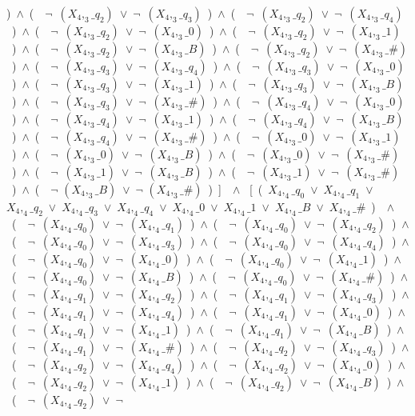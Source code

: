 ﻿\documentclass[a4paper,10pt]{article}
\begin{document}
)\ $\wedge$\ (\ \ $\neg$\ $(X_4,_3\_q_2)$\ $\vee$\ $\neg$\ $(X_4,_3\_q_3)$\ )\ $\wedge$\ (\ \ $\neg$\ $(X_4,_3\_q_2)$\ $\vee$\ $\neg$\ $(X_4,_3\_q_4)$\ )\ $\wedge$\ (\ \ $\neg$\ $(X_4,_3\_q_2)$\ $\vee$\ $\neg$\ $(X_4,_3\_0)$\ )\ $\wedge$\ (\ \ $\neg$\ $(X_4,_3\_q_2)$\ $\vee$\ $\neg$\ $(X_4,_3\_1)$\ )\ $\wedge$\ (\ \ $\neg$\ $(X_4,_3\_q_2)$\ $\vee$\ $\neg$\ $(X_4,_3\_B)$\ )\ $\wedge$\ (\ \ $\neg$\ $(X_4,_3\_q_2)$\ $\vee$\ $\neg$\ $(X_4,_3\_\#)$\ )\ $\wedge$\ (\ \ $\neg$\ $(X_4,_3\_q_3)$\ $\vee$\ $\neg$\ $(X_4,_3\_q_4)$\ )\ $\wedge$\ (\ \ $\neg$\ $(X_4,_3\_q_3)$\ $\vee$\ $\neg$\ $(X_4,_3\_0)$\ )\ $\wedge$\ (\ \ $\neg$\ $(X_4,_3\_q_3)$\ $\vee$\ $\neg$\ $(X_4,_3\_1)$\ )\ $\wedge$\ (\ \ $\neg$\ $(X_4,_3\_q_3)$\ $\vee$\ $\neg$\ $(X_4,_3\_B)$\ )\ $\wedge$\ (\ \ $\neg$\ $(X_4,_3\_q_3)$\ $\vee$\ $\neg$\ $(X_4,_3\_\#)$\ )\ $\wedge$\ (\ \ $\neg$\ $(X_4,_3\_q_4)$\ $\vee$\ $\neg$\ $(X_4,_3\_0)$\ )\ $\wedge$\ (\ \ $\neg$\ $(X_4,_3\_q_4)$\ $\vee$\ $\neg$\ $(X_4,_3\_1)$\ )\ $\wedge$\ (\ \ $\neg$\ $(X_4,_3\_q_4)$\ $\vee$\ $\neg$\ $(X_4,_3\_B)$\ )\ $\wedge$\ (\ \ $\neg$\ $(X_4,_3\_q_4)$\ $\vee$\ $\neg$\ $(X_4,_3\_\#)$\ )\ $\wedge$\ (\ \ $\neg$\ $(X_4,_3\_0)$\ $\vee$\ $\neg$\ $(X_4,_3\_1)$\ )\ $\wedge$\ (\ \ $\neg$\ $(X_4,_3\_0)$\ $\vee$\ $\neg$\ $(X_4,_3\_B)$\ )\ $\wedge$\ (\ \ $\neg$\ $(X_4,_3\_0)$\ $\vee$\ $\neg$\ $(X_4,_3\_\#)$\ )\ $\wedge$\ (\ \ $\neg$\ $(X_4,_3\_1)$\ $\vee$\ $\neg$\ $(X_4,_3\_B)$\ )\ $\wedge$\ (\ \ $\neg$\ $(X_4,_3\_1)$\ $\vee$\ $\neg$\ $(X_4,_3\_\#)$\ )\ $\wedge$\ (\ \ $\neg$ $(X_4,_3\_B)$\ $\vee$\ $\neg$ $(X_4,_3\_\#)$\ )\ ]\ \ $\wedge$ \ [\ (\ $X_4,_4\_q_0$\ $\vee$\ $X_4,_4\_q_1$\ $\vee$\ $X_4,_4\_q_2$\ $\vee$\ $X_4,_4\_q_3$\ $\vee$\ $X_4,_4\_q_4$\ $\vee$\ $X_4,_4\_0$\ $\vee$\ $X_4,_4\_1$\ $\vee$\ $X_4,_4\_B$\ $\vee$\ $X_4,_4\_\#$\ )\ \ $\wedge$ \ (\ \ $\neg$\ $(X_4,_4\_q_0)$\ $\vee$\ $\neg$\ $(X_4,_4\_q_1)$\ )\ $\wedge$\ (\ \ $\neg$\ $(X_4,_4\_q_0)$\ $\vee$\ $\neg$\ $(X_4,_4\_q_2)$\ )\ $\wedge$\ (\ \ $\neg$\ $(X_4,_4\_q_0)$\ $\vee$\ $\neg$\ $(X_4,_4\_q_3)$\ )\ $\wedge$\ (\ \ $\neg$\ $(X_4,_4\_q_0)$\ $\vee$\ $\neg$\ $(X_4,_4\_q_4)$\ )\ $\wedge$\ (\ \ $\neg$\ $(X_4,_4\_q_0)$\ $\vee$\ $\neg$\ $(X_4,_4\_0)$\ )\ $\wedge$\ (\ \ $\neg$\ $(X_4,_4\_q_0)$\ $\vee$\ $\neg$\ $(X_4,_4\_1)$\ )\ $\wedge$\ (\ \ $\neg$\ $(X_4,_4\_q_0)$\ $\vee$\ $\neg$\ $(X_4,_4\_B)$\ )\ $\wedge$\ (\ \ $\neg$\ $(X_4,_4\_q_0)$\ $\vee$\ $\neg$\ $(X_4,_4\_\#)$\ )\ $\wedge$\ (\ \ $\neg$\ $(X_4,_4\_q_1)$\ $\vee$\ $\neg$\ $(X_4,_4\_q_2)$\ )\ $\wedge$\ (\ \ $\neg$\ $(X_4,_4\_q_1)$\ $\vee$\ $\neg$\ $(X_4,_4\_q_3)$\ )\ $\wedge$\ (\ \ $\neg$\ $(X_4,_4\_q_1)$\ $\vee$\ $\neg$\ $(X_4,_4\_q_4)$\ )\ $\wedge$\ (\ \ $\neg$\ $(X_4,_4\_q_1)$\ $\vee$\ $\neg$\ $(X_4,_4\_0)$\ )\ $\wedge$\ (\ \ $\neg$\ $(X_4,_4\_q_1)$\ $\vee$\ $\neg$\ $(X_4,_4\_1)$\ )\ $\wedge$\ (\ \ $\neg$\ $(X_4,_4\_q_1)$\ $\vee$\ $\neg$\ $(X_4,_4\_B)$\ )\ $\wedge$\ (\ \ $\neg$\ $(X_4,_4\_q_1)$\ $\vee$\ $\neg$\ $(X_4,_4\_\#)$\ )\ $\wedge$\ (\ \ $\neg$\ $(X_4,_4\_q_2)$\ $\vee$\ $\neg$\ $(X_4,_4\_q_3)$\ )\ $\wedge$\ (\ \ $\neg$\ $(X_4,_4\_q_2)$\ $\vee$\ $\neg$\ $(X_4,_4\_q_4)$\ )\ $\wedge$\ (\ \ $\neg$\ $(X_4,_4\_q_2)$\ $\vee$\ $\neg$\ $(X_4,_4\_0)$\ )\ $\wedge$\ (\ \ $\neg$\ $(X_4,_4\_q_2)$\ $\vee$\ $\neg$\ $(X_4,_4\_1)$\ )\ $\wedge$\ (\ \ $\neg$\ $(X_4,_4\_q_2)$\ $\vee$\ $\neg$\ $(X_4,_4\_B)$\ )\ $\wedge$\ (\ \ $\neg$\ $(X_4,_4\_q_2)$\ $\vee$\ $\neg$\ 
\end{document}
